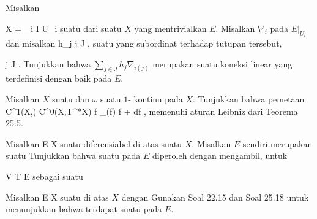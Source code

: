 {}
{

Misalkan

\mavergleichskette
{\vergleichskette
{ X
}
{ = }{ \bigcup_{i \in I} U_i
}
{  }{
}
{    }{
}
{   }{
}
}
{}{}{}
suatu
dari suatu
$X$ yang mentrivialkan
$E$. Misalkan $\nabla_i$
pada $E\vert_{U_i }$ dan misalkan
\mathkor {} {h_j} {} {j \in J} {,}
suatu
yang subordinat terhadap tutupan tersebut,

 {}
 {j \in J} {}
 {} {} {} {.}
Tunjukkan bahwa $\sum_{j \in J} h_j \nabla_{i(j)}$ merupakan suatu koneksi linear yang terdefinisi dengan baik pada $E$.

}
{} {}

{}
{

Misalkan $X$ suatu
dan $\omega$ suatu
$1$-
kontinu pada $X$. Tunjukkan bahwa pemetaan
\maabbeledisp {} {C^1(X,\R)} { C^0(X,T^*X)
} { f } { \nabla_\omega (f)  f \omega + df
} {,}
memenuhi aturan Leibniz dari
Teorema 25.5.

}
{} {}

{}
{

Misalkan
 { E } { X
} {}
suatu
diferensiabel di atas suatu
$X$. Misalkan $E$ sendiri merupakan suatu
Tunjukkan bahwa suatu
pada $E$ diperoleh dengan mengambil, untuk

\mavergleichskette
{\vergleichskette
{ V
}
{ \subseteq }{ T E
}
{  }{
}
{    }{
}
{   }{
}
}
{}{}{}
sebagai suatu

}
{} {}

{}
{

Misalkan
 { E } { X
} {}
suatu
di atas
$X$ dengan
Gunakan
Soal 22.15
dan
Soal 25.18
untuk menunjukkan bahwa terdapat suatu
pada $E$.

}
{} {}

